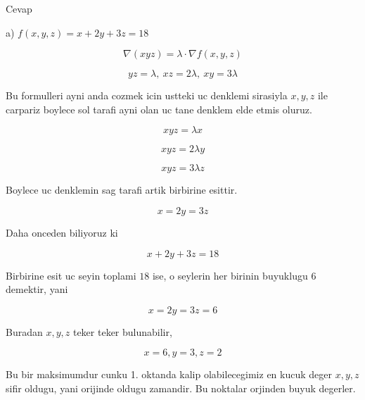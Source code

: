 \documentclass[12pt,fleqn]{article}
\begin{document}
Cevap

a) $f(x,y,z) = x + 2y + 3z = 18$

\[ \nabla (xyz) = \lambda \cdot \nabla f(x,y,z) \]

\[ yz = \lambda, \ xz = 2\lambda, \ xy = 3\lambda \]

Bu formulleri ayni anda cozmek icin ustteki uc denklemi sirasiyla $x,y,z$
ile carpariz boylece sol tarafi ayni olan uc tane denklem elde etmis
oluruz. 

\[ xyz = \lambda x \]

\[ xyz = 2 \lambda y \]

\[ xyz = 3 \lambda z \]

Boylece uc denklemin sag tarafi artik birbirine esittir. 

\[ x = 2y = 3z \]

Daha onceden biliyoruz ki

\[ x + 2y + 3z = 18 \]

Birbirine esit uc seyin toplami $18$ ise, o seylerin her birinin buyuklugu
$6$ demektir, yani 

\[ x = 2y = 3z = 6\]

Buradan $x,y,z$ teker teker bulunabilir,

\[ x = 6, y=3, z= 2 \]

Bu bir maksimumdur cunku 1. oktanda kalip olabilecegimiz en kucuk deger
$x,y,z$ sifir oldugu, yani orijinde oldugu zamandir. Bu noktalar orjinden
buyuk degerler. 
\end{document}
